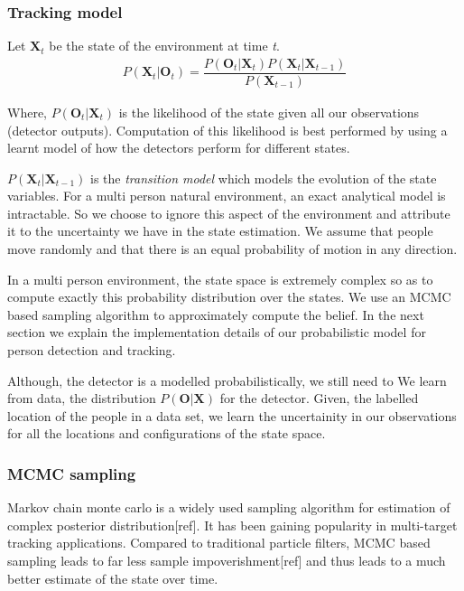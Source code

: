 \subsubsection{Tracking model}

Let $\textbf{X}_{t}$ be the state of the environment at time \textit{t}.
\begin{align}
P(\textbf{X}_{t} | \textbf{O}_{t}) = \dfrac{P(\textbf{O}_{t} | \textbf{X}_{t}) P(\textbf{X}_{t}|\textbf{X}_{t-1})} {P(\textbf{X}_{t-1})}
\end{align} 

Where, $P(\textbf{O}_{t} | \textbf{X}_{t})$ is the likelihood of the state given all our observations (detector outputs). Computation of this likelihood is best performed by using a learnt model of how the detectors perform for different states.

$P(\textbf{X}_{t}|\textbf{X}_{t-1})$ is the \textit{transition model} which models the evolution of the state variables. For a multi person natural environment, an exact analytical model is intractable. So we choose to ignore this aspect of the environment and attribute it to the uncertainty we have in the state estimation. We assume that people move randomly and that there is an equal probability of motion in any direction. 

In a multi person environment, the state space is extremely complex so as to compute exactly this probability 
distribution over the states. We use an MCMC based sampling algorithm to approximately compute the belief. In the next section we explain the implementation details of our probabilistic model for person detection and tracking.


Although, the detector is a modelled probabilistically, we still need to
We learn from data, the distribution $P(\textbf{O}|\textbf{X})$ for the detector. Given, the labelled location of the people in a data set, we learn the uncertainity in our observations for all the locations and configurations of the state space.
\subsubsection{MCMC sampling}
\label{MCMC}
Markov chain monte carlo is a widely used sampling algorithm for estimation of complex posterior distribution[ref]. It has been gaining popularity in multi-target tracking applications. Compared to traditional particle filters, MCMC based sampling leads to far less sample impoverishment[ref] and thus leads to a much better estimate of the state over time.

